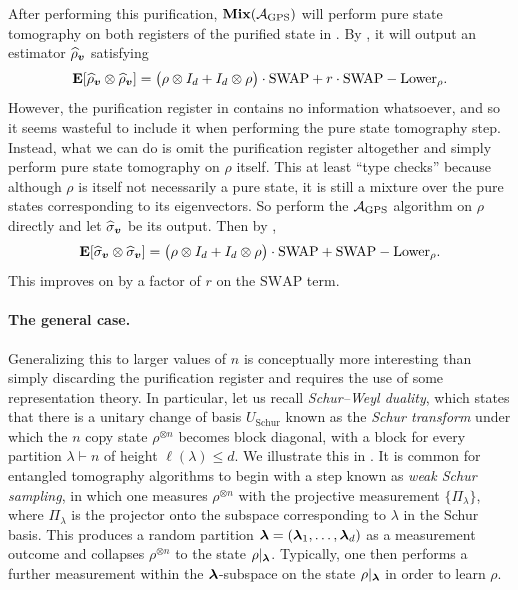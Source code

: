 \documentclass{article}
\newcommand{\mixed}{\textup{\textbf{Mix}}}
\newcommand{\gps}{\calA_{\mathrm{GPS}}}
\newcommand{\swap}{\mathrm{SWAP}}
\newcommand{\schur}{U_{\mathrm{Schur}}}
\begin{document}
After performing this purification,
$\mixed(\gps)$ will perform pure state tomography on both registers of the purified state in .
By , it will output an estimator $\widehat{\rho}_{\boldsymbol{v}}$ satisfying
\begin{equation}\label{eq:bad-second-moment}
\E[\widehat{\rho}_{\bv}\otimes \widehat{\rho}_{\bv}] = \big(\rho \otimes I_d + I_d \otimes \rho\big) \cdot \swap + r \cdot \swap-\mathrm{Lower}_{\rho}.
\end{equation}
However, the purification register in  contains no information whatsoever,
and so it seems wasteful to include it when performing the pure state tomography step.
Instead, what we can do is omit the purification register altogether and simply perform pure state tomography on $\rho$ itself.
This at least ``type checks'' because although $\rho$ is itself not necessarily a pure state,
it is still a mixture over the pure states corresponding to its eigenvectors.
So perform the $\gps$ algorithm on $\rho$ directly and let $\widehat{\sigma}_{\boldsymbol{v}}$ be its output.
Then by ,
\begin{equation*}
\E[\widehat{\sigma}_{\bv}\otimes \widehat{\sigma}_{\bv}] = \big(\rho \otimes I_d + I_d \otimes \rho\big) \cdot \swap + \swap-\mathrm{Lower}_{\rho}.
\end{equation*}
This improves on  by a factor of $r$ on the $\swap$ term.

\paragraph{The general case.}
Generalizing this to larger values of $n$
is conceptually more interesting than simply discarding the purification register
and requires the use of some representation theory.
In particular, let us recall \emph{Schur--Weyl duality},
which states that there is a unitary change of basis $\schur$ known as the \emph{Schur transform} under which the $n$ copy state $\rho^{\otimes n}$ becomes block diagonal,
with a block for every partition $\lambda \vdash n$ of height $\ell(\lambda) \leq d$.
We illustrate this in .
It is common for entangled tomography algorithms to begin with a step known as \emph{weak Schur sampling}, in which one measures $\rho^{\otimes n}$ with the projective measurement $\{\Pi_{\lambda}\}$,
where $\Pi_{\lambda}$ is the projector onto the subspace corresponding to $\lambda$ in the Schur basis.
This produces a random partition $\boldsymbol{\lambda} = (\boldsymbol{\lambda}_1, \ldots, \boldsymbol{\lambda}_d)$ as a measurement outcome and collapses $\rho^{\otimes n}$ to the state $\rho|_{\boldsymbol{\lambda}}$.
Typically, one then performs a further measurement within the $\boldsymbol{\lambda}$-subspace on the state $\rho|_{\boldsymbol{\lambda}}$ in order to learn $\rho$.
\end{document}
